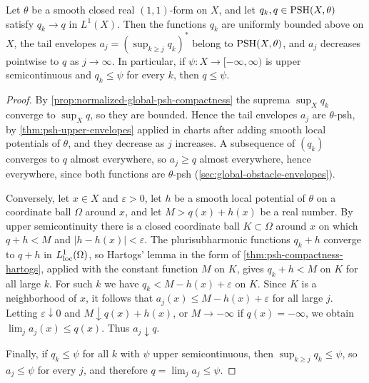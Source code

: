 \begin{lemma}\label{lem:global-lone-tail-envelopes}
Let $\theta$ be a smooth closed real $(1,1)$-form on $X$, and let $q_k,q\in\mathrm{PSH}(X,\theta)$ satisfy $q_k\to q$ in $L^1(X)$. Then the functions $q_k$ are uniformly bounded above on $X$, the tail envelopes $a_j=(\sup_{k\geq j}q_k)^*$ belong to $\mathrm{PSH}(X,\theta)$, and $a_j$ decreases pointwise to $q$ as $j\to\infty$. In particular, if $\psi\colon X\to[-\infty,\infty)$ is upper semicontinuous and $q_k\leq\psi$ for every $k$, then $q\leq\psi$.
\end{lemma}
\begin{proof}
By \cref{prop:normalized-global-psh-compactness} the suprema $\sup_Xq_k$ converge to $\sup_Xq$, so they are bounded. Hence the tail envelopes $a_j$ are $\theta$-psh, by \cref{thm:psh-upper-envelopes} applied in charts after adding smooth local potentials of $\theta$, and they decrease as $j$ increases. A subsequence of $(q_k)$ converges to $q$ almost everywhere, so $a_j\geq q$ almost everywhere, hence everywhere, since both functions are $\theta$-psh (\cref{sec:global-obstacle-envelopes}).

Conversely, let $x\in X$ and $\varepsilon>0$, let $h$ be a smooth local potential of $\theta$ on a coordinate ball $\Omega$ around $x$, and let $M>q(x)+h(x)$ be a real number. By upper semicontinuity there is a closed coordinate ball $K\subset\Omega$ around $x$ on which $q+h<M$ and $|h-h(x)|<\varepsilon$. The plurisubharmonic functions $q_k+h$ converge to $q+h$ in $L^1_{\mathrm{loc}}(\Omega)$, so Hartogs' lemma in the form of \cref{thm:psh-compactness-hartogs}, applied with the constant function $M$ on $K$, gives $q_k+h<M$ on $K$ for all large $k$. For such $k$ we have $q_k<M-h(x)+\varepsilon$ on $K$. Since $K$ is a neighborhood of $x$, it follows that $a_j(x)\leq M-h(x)+\varepsilon$ for all large $j$. Letting $\varepsilon\downarrow0$ and $M\downarrow q(x)+h(x)$, or $M\to-\infty$ if $q(x)=-\infty$, we obtain $\lim_ja_j(x)\leq q(x)$. Thus $a_j\downarrow q$.

Finally, if $q_k\leq\psi$ for all $k$ with $\psi$ upper semicontinuous, then $\sup_{k\geq j}q_k\leq\psi$, so $a_j\leq\psi$ for every $j$, and therefore $q=\lim_ja_j\leq\psi$.
\end{proof}


